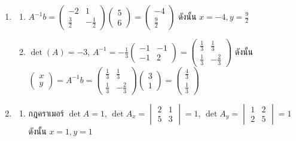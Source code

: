 \begin{enumerate}[label={},leftmargin=0pt,start=10]
    \item
    \begin{enumerate}[label=\textbf{\thechapter.\arabic{enumi}.\arabic*}]
        \item $A^{-1}b = \begin{pmatrix}-2 & 1\\ \frac{3}{2} & -\frac{1}{2}\end{pmatrix}\begin{pmatrix}5\\ 6\end{pmatrix} = \begin{pmatrix}-4\\ \frac{9}{2}\end{pmatrix}$ ดังนั้น $x=-4, y=\frac{9}{2}$
        \item $\det(A) = -3$, $A^{-1} = -\frac{1}{3}\begin{pmatrix}-1 & -1\\ -1 & 2\end{pmatrix} = \begin{pmatrix}\frac{1}{3} & \frac{1}{3}\\ \frac{1}{3} & -\frac{2}{3}\end{pmatrix}$ ดังนั้น $\begin{pmatrix}x\\y\end{pmatrix} = A^{-1}b = \begin{pmatrix}\frac{1}{3} & \frac{1}{3}\\ \frac{1}{3} & -\frac{2}{3}\end{pmatrix}\begin{pmatrix}3\\1\end{pmatrix} = \begin{pmatrix}\frac{4}{3}\\ \frac{1}{3}\end{pmatrix}$
    \end{enumerate}
    \item
    \begin{enumerate}[label=\textbf{\thechapter.\arabic{enumi}.\arabic*}]
        \item กฎคราเมอร์ $\det A = 1$, $\det A_x = \begin{vmatrix}2 & 1\\ 5 & 3\end{vmatrix} = 1$, $\det A_y = \begin{vmatrix}1 & 2\\ 2 & 5\end{vmatrix} = 1$ ดังนั้น $x = 1, y = 1$

\end{enumerate}
\end{enumerate}
